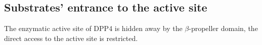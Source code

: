 \subsection{Substrates' entrance to the active site}

The enzymatic active site of DPP4 is hidden away by the $\beta$-propeller domain, the direct access to the active site is restricted. 